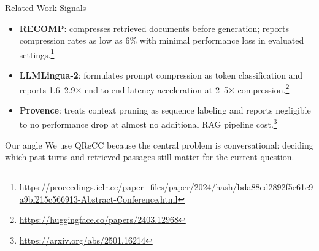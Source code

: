 \documentclass[aspectratio=169,11pt]{beamer}
\begin{document}
\begin{frame}{Related Work Signals}
  \begin{itemize}
    \item \textbf{RECOMP}: compresses retrieved documents before generation; reports compression rates as low as 6\% with minimal performance loss in evaluated settings.\footnote{\url{https://proceedings.iclr.cc/paper_files/paper/2024/hash/bda88ed2892f5e61c9a9bf215c566913-Abstract-Conference.html}}
    \item \textbf{LLMLingua-2}: formulates prompt compression as token classification and reports 1.6--2.9$\times$ end-to-end latency acceleration at 2--5$\times$ compression.\footnote{\url{https://huggingface.co/papers/2403.12968}}
    \item \textbf{Provence}: treats context pruning as sequence labeling and reports negligible to no performance drop at almost no additional RAG pipeline cost.\footnote{\url{https://arxiv.org/abs/2501.16214}}
  \end{itemize}

  \vspace{0.5em}
  \begin{block}{Our angle}
    We use QReCC because the central problem is conversational: deciding which past turns and retrieved passages still matter for the current question.
  \end{block}
\end{frame}
\end{document}
